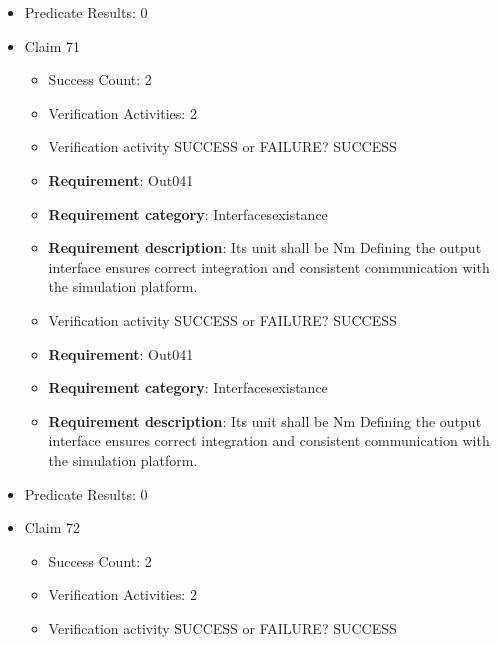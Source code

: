 \documentclass{article}
\begin{document}
\begin{itemize}
\begin{itemize}
					\item Verification activity SUCCESS or FAILURE? SUCCESS
		
						\item \textbf{Requirement}: Out040 
						\item \textbf{Requirement category}: Interfacesexistance 
						\item \textbf{Requirement description}: Its unit shall be Nm Defining the output interface ensures correct integration and consistent communication with the simulation platform.
					
				\end{itemize}
				
									    
				\item Predicate Results: 0

  				  \item Claim 71
				\begin{itemize}
			    	\item Success Count: 2 
			    	\item Verification Activities: 2
					\item Verification activity SUCCESS or FAILURE? SUCCESS
		
						\item \textbf{Requirement}: Out041 
						\item \textbf{Requirement category}: Interfacesexistance 
						\item \textbf{Requirement description}: Its unit shall be Nm Defining the output interface ensures correct integration and consistent communication with the simulation platform.
					
					\item Verification activity SUCCESS or FAILURE? SUCCESS
		
						\item \textbf{Requirement}: Out041 
						\item \textbf{Requirement category}: Interfacesexistance 
						\item \textbf{Requirement description}: Its unit shall be Nm Defining the output interface ensures correct integration and consistent communication with the simulation platform.
					
				\end{itemize}
				
									    
				\item Predicate Results: 0

  				  \item Claim 72
				\begin{itemize}
			    	\item Success Count: 2 
			    	\item Verification Activities: 2
					\item Verification activity SUCCESS or FAILURE? SUCCESS
		

\end{itemize}
\end{itemize}
\end{document}
